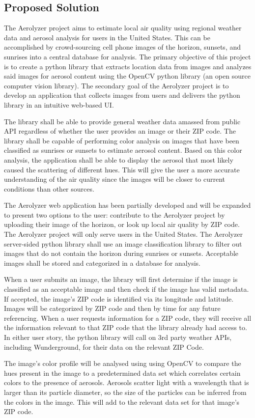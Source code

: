 \documentclass[letterpaper,10pt,draftclsnofoot,onecolumn]{IEEEtran}
\newcommand\tab[1][1cm]{\hspace*{#1}}
\begin{document}
\begin{flushleft}
\section{Proposed Solution}
\tab The Aerolyzer project aims to estimate local air quality using regional weather data and aerosol analysis for users in the United States. This can be accomplished by crowd-sourcing cell phone images of the horizon, sunsets, and sunrises into a central database for analysis. The primary objective of this project is to create a python library that extracts location data from images and analyzes said images for aerosol content using the OpenCV python library (an open source computer vision library). The secondary goal of the Aerolyzer project is to develop an application that collects images from users and delivers the python library in an intuitive web-based UI. 
\par
\tab The library shall be able to provide general weather data amassed from public API regardless of whether the user provides an image or their ZIP code. The library  shall be capable of performing color analysis on images that have been classified as sunrises or sunsets to estimate aerosol content. Based on this color analysis, the application shall be able to display the aerosol that most likely caused the scattering of different hues. This will give the user a more accurate understanding of the air quality since the images will be closer to current conditions than other sources.
\par
\tab The Aerolyzer web application has been partially developed and will be expanded to present two options to the user: contribute to the Aerolyzer project by uploading their image of the horizon, or look up local air quality by ZIP code. The Aerolyzer project will only serve users in the United States. The Aerolyzer server-sided python library shall use an image classification library to filter out images that do not contain the horizon during sunrises or sunsets. Acceptable images shall be stored and categorized in a database for analysis. 
\par
\tab When a user submits an image, the library will first determine if the image is classified as an acceptable image and then check if the image has valid metadata. If accepted, the image's ZIP code is identified via its longitude and latitude. Images will be categorized by ZIP code and then by time for any future referencing. When a user requests information for a ZIP code, they will receive all the information relevant to that ZIP code that the library already had access to. In either user story, the python library will call on 3rd party weather APIs, including Wunderground, for their data on the relevant ZIP Code.
\par
\tab The image's color profile will be analysed using using OpenCV to compare the hues present in the image to a predetermined data set which correlates certain colors to the presence of aerosols. Aerosols scatter light with a wavelength that is larger than its particle diameter, so the size of the particles can be inferred from the colors in the image. This will add to the relevant data set for that image's ZIP code. 


\end{flushleft}
\end{document}
